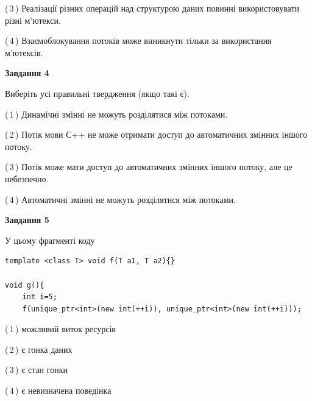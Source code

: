 \documentclass[12pt, ukrainian]{article}
\begin{document}
\begin {large}
{(\,3\,) Реалізації різних операцій над структурою даних повинні використовувати різні м’ютекси.%

(\,4\,) Взаємоблокування потоків може виникнути тільки за використання м’ютексів.%



\begin{center}
\textbf{Завдання 4}
\end{center}
Виберіть усі правильні твердження (якщо такі є).\par
\vspace{2mm}

(\,1\,) Динамічні змінні не можуть розділятися між потоками.%

(\,2\,) Потік мови С++ не може отримати доступ до автоматичних змінних іншого потоку.%

(\,3\,) Потік може мати доступ до автоматичних змінних іншого потоку, але це небезпечно.%

(\,4\,) Автоматичні змінні не можуть розділятися між потоками.%



\begin{center}
\textbf{Завдання 5}
\end{center}
У цьому фрагменті коду
\begin{verbatim}
template <class T> void f(T a1, T a2){}

void g(){
    int i=5;
    f(unique_ptr<int>(new int(++i)), unique_ptr<int>(new int(++i)));
\end{verbatim}

(\,1\,) можливий виток ресурсів%

(\,2\,) є гонка даних%

(\,3\,) є стан гонки%

(\,4\,) є невизначена поведінка%


}
\end {large}
\end{document}
